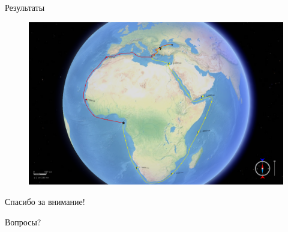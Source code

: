 \documentclass[russian, hyperref={unicode}]{beamer}
\begin{document}
\begin{frame}{Результаты}
     {
        \begin{figure}
            \includegraphics[width=\textwidth]{Results/3}
        \end{figure}
    }

\end{frame}

\begin{frame}{Спасибо за внимание!}
    \begin{center}
        \Huge
        {\color{blue} Вопросы?}
    \end{center}
\end{frame}

\appendix
\end{document}
